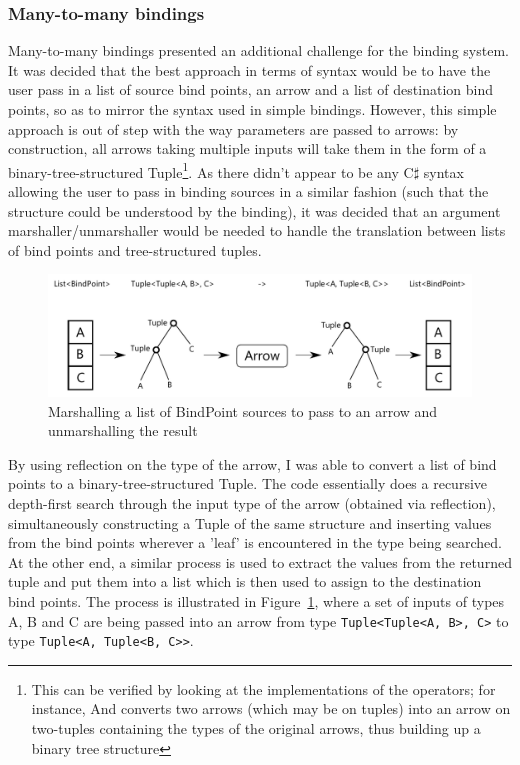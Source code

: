 \documentclass[12pt,twoside,notitlepage]{report}
\begin{document}
\subsubsection{Many-to-many bindings}

Many-to-many bindings presented an additional challenge for the binding system. It was decided that the best approach in terms of syntax would be to have the user pass in a list of source bind points, an arrow and a list of destination bind points, so as to mirror the syntax used in simple bindings. However, this simple approach is out of step with the way parameters are passed to arrows: by construction, all arrows taking multiple inputs will take them in the form of a binary-tree-structured Tuple\footnote{This can be verified by looking at the implementations of the operators; for instance, And converts two arrows (which may be on tuples) into an arrow on two-tuples containing the types of the original arrows, thus building up a binary tree structure}. As there didn't appear to be any C$\sharp$ syntax allowing the user to pass in binding sources in a similar fashion (such that the structure could be understood by the binding), it was decided that an argument marshaller/unmarshaller would be needed to handle the translation between lists of bind points and tree-structured tuples.

\begin{figure}[!ht]
  \centering
  \includegraphics[width=\textwidth]{fig/ArgumentMarshalling.pdf}
  \caption{Marshalling a list of BindPoint sources to pass to an arrow and unmarshalling the result}
  \label{fig:argument_marshalling}
\end{figure}

By using reflection on the type of the arrow, I was able to convert a list of bind points to a binary-tree-structured Tuple. The code essentially does a recursive depth-first search through the input type of the arrow (obtained via reflection), simultaneously constructing a Tuple of the same structure and inserting values from the bind points wherever a 'leaf' is encountered in the type being searched. At the other end, a similar process is used to extract the values from the returned tuple and put them into a list which is then used to assign to the destination bind points. The process is illustrated in Figure~\ref{fig:argument_marshalling}, where a set of inputs of types A, B and C are being passed into an arrow from type \texttt{Tuple<Tuple<A, B>, C>} to type \texttt{Tuple<A, Tuple<B, C>>}.
\end{document}

